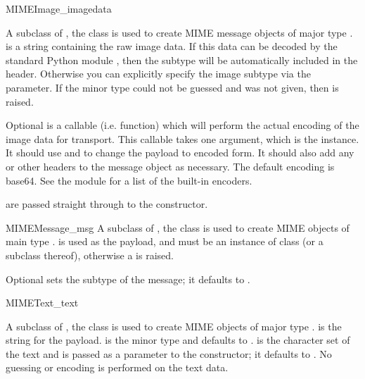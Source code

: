 \begin{classdesc}{MIMEImage}{_imagedata}

A subclass of , the  class is
used to create MIME message objects of major type .
 is a string containing the raw image data.  If this
data can be decoded by the standard Python module ,
then the subtype will be automatically included in the
 header.  Otherwise you can explicitly specify the
image subtype via the  parameter.  If the minor type could
not be guessed and  was not given, then 
is raised.

Optional  is a callable (i.e. function) which will
perform the actual encoding of the image data for transport.  This
callable takes one argument, which is the  instance.
It should use  and  to
change the payload to encoded form.  It should also add any
 or other headers to the message
object as necessary.  The default encoding is base64.  See the
 module for a list of the built-in encoders.

 are passed straight through to the 
constructor.
\end{classdesc}

\begin{classdesc}{MIMEMessage}{_msg}
A subclass of , the  class
is used to create MIME objects of main type .
 is used as the payload, and must be an instance of class
 (or a subclass thereof), otherwise a
 is raised.

Optional  sets the subtype of the message; it defaults
to .
\end{classdesc}

\begin{classdesc}{MIMEText}{_text}

A subclass of , the  class is
used to create MIME objects of major type .
 is the string for the payload.   is the
minor type and defaults to .   is the
character set of the text and is passed as a parameter to the
 constructor; it defaults to .  No
guessing or encoding is performed on the text data.

\end{classdesc}
